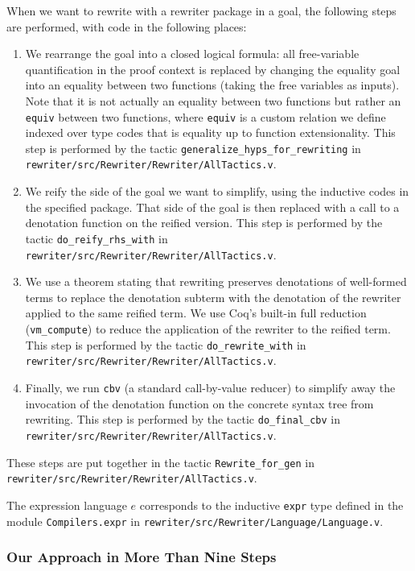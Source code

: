 \documentclass[a4paper,USenglish,cleveref,autoref,thm-restate]{lipics-v2021}
\newcommand{\tacvmcompute}{\texttt{vm_compute}}
\newcommand{\taccbv}{\texttt{cbv}}
\begin{document}
When we want to rewrite with a rewriter package in a goal, the following steps are performed, with code in the following places:
\begin{enumerate}
  \item
    We rearrange the goal into a closed logical formula: all free-variable quantification in the proof context is replaced by changing the equality goal into an equality between two functions (taking the free variables as inputs).
    Note that it is not actually an equality between two functions but rather an \texttt{equiv} between two functions, where \texttt{equiv} is a custom relation we define indexed over type codes that is equality up to function extensionality.
    This step is performed by the tactic \texttt{generalize\_hyps\_for\_rewriting} in \texttt{rewriter/src/Rewriter/Rewriter/AllTactics.v}.
  \item
    We reify the side of the goal we want to simplify, using the inductive codes in the specified package.
    That side of the goal is then replaced with a call to a denotation function on the reified version.
    This step is performed by the tactic \texttt{do\_reify\_rhs\_with} in \texttt{rewriter/src/Rewriter/Rewriter/AllTactics.v}.
  \item
    We use a theorem stating that rewriting preserves denotations of well-formed terms to replace the denotation subterm with the denotation of the rewriter applied to the same reified term.
    We use Coq's built-in full reduction (\tacvmcompute{}) to reduce the application of the rewriter to the reified term.
    This step is performed by the tactic \texttt{do\_rewrite\_with} in \texttt{rewriter/src/Rewriter/Rewriter/AllTactics.v}.
  \item
    Finally, we run \taccbv{} (a standard call-by-value reducer) to simplify away the invocation of the denotation function on the concrete syntax tree from rewriting.
    This step is performed by the tactic \texttt{do\_final\_cbv} in \texttt{rewriter/src/Rewriter/Rewriter/AllTactics.v}.
\end{enumerate}
These steps are put together in the tactic \texttt{Rewrite\_for\_gen} in \texttt{rewriter/src/Rewriter/Rewriter/AllTactics.v}.

The expression language $e$ corresponds to the inductive \texttt{expr} type defined in the module \texttt{Compilers.expr} in \texttt{rewriter/src/Rewriter/Language/Language.v}.

\subsubsection*{Our Approach in More Than Nine Steps}
\end{document}
